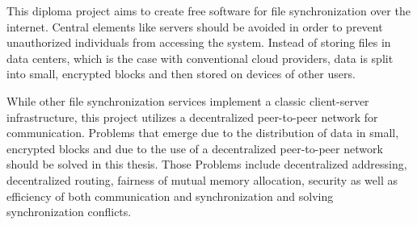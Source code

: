 This diploma project aims to create free software for file synchronization over the internet.
Central elements like servers should be avoided in order to prevent unauthorized individuals from accessing the system.
Instead of storing files in data centers, which is the case with conventional cloud providers, data is split into small, encrypted blocks and then stored on devices of other users.

While other file synchronization services implement a classic client-server infrastructure, this project utilizes a decentralized peer-to-peer network for communication.
Problems that emerge due to the distribution of data in small, encrypted blocks and due to the use of a decentralized peer-to-peer network should be solved in this thesis.
Those Problems include decentralized addressing, decentralized routing, fairness of mutual memory allocation, security as well as efficiency of both communication and synchronization and solving synchronization conflicts.

